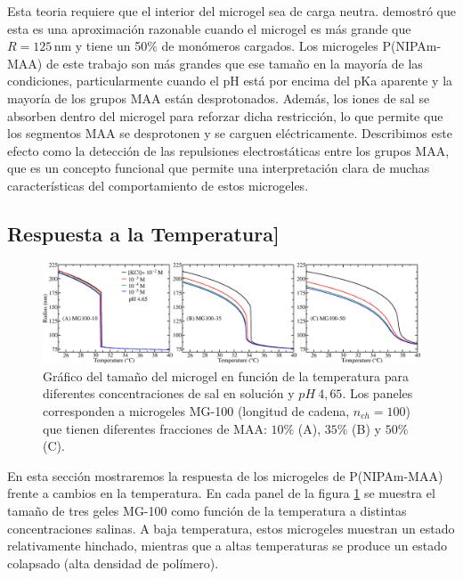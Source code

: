 Esta teoria requiere que el interior del microgel sea de carga neutra.
 demostr\'o que esta es una aproximación razonable cuando el microgel es m\'as grande que $R=125\,\text{nm}$ y tiene un 50\% de mon\'omeros cargados.
Los microgeles P(NIPAm-MAA) de este trabajo son m\'as grandes que ese tama\~no en la mayor\'ia de las condiciones, particularmente cuando el pH está por encima del pKa aparente y la mayor\'ia de los grupos MAA est\'an desprotonados.
Adem\'as, los iones de sal se absorben dentro del microgel para reforzar dicha restricci\'on, lo que permite que los segmentos MAA se desprotonen y se carguen el\'ectricamente.
Describimos este efecto como la detecci\'on de las repulsiones electrost\'aticas entre los grupos MAA, que es un concepto funcional que permite una interpretaci\'on clara de muchas caracter\'isticas del comportamiento de estos microgeles. %




\subsection{Respuesta a la Temperatura]}\label{sec:temperature}

\begin{figure}[!htb]
	\centering
	\includegraphics[width=1\linewidth]{Figures/graph-gel/R-T.png}
	\caption{Gr\'afico del tama\~no del microgel en funci\'on de la temperatura para diferentes concentraciones de sal en soluci\'on y $pH~4,65$.
		Los paneles corresponden a microgeles MG-100 (longitud de cadena, $n_{ch}=100$) que tienen diferentes fracciones de MAA: $10\%$ (A), $35\%$ (B) y $50\%$ (C).}
	\label{fig:R-T}
\end{figure}


En esta secci\'on mostraremos la respuesta de los microgeles de P(NIPAm-MAA) frente a cambios en la temperatura.
En cada panel de la figura \ref{fig:R-T} se muestra el tama\~no de tres geles MG-100 como funci\'on de la temperatura a distintas concentraciones salinas.
A baja temperatura, estos microgeles muestran un estado relativamente hinchado, mientras que a altas temperaturas se produce un estado colapsado (alta densidad de polímero).


